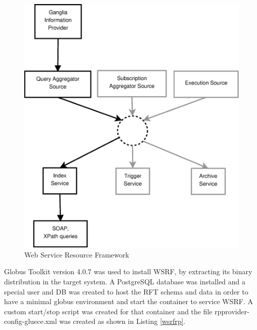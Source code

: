 \begin{figure}[htb]
\centering
 \includegraphics[width=120mm]{images/wsrf.eps}
\caption{Web Service Resource Framework}
\label{figure:wsrf}
\end{figure}

Globus Toolkit version 4.0.7 was used to install WSRF, by extracting its binary distribution in the target system. A PostgreSQL database was installed and a special user and DB was created to host the RFT schema and data in order to have a minimal globus environment and start the container to service WSRF. A custom start/stop script was created for that container and the file rpprovider-config-gluece.xml was created as shown in Listing \ref{wsrfrp}.

